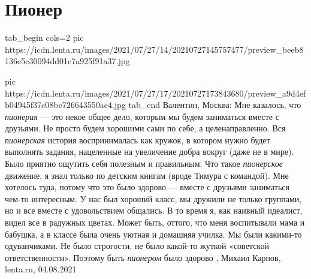  
 
 
 
 
\chapter{Пионер}

\ifcmt
tab_begin cols=2
  pic https://icdn.lenta.ru/images/2021/07/27/14/20210727145757477/preview_beeb8136c5c30094dd01c7a925f91a37.jpg

	pic https://icdn.lenta.ru/images/2021/07/27/17/20210727173843680/preview_a9d4efb04945f37c08bc726643550ae4.jpg
tab_end
\fi
Валентин, Москва: Мне казалось, что \emph{пионерия} — это некое общее дело, которым мы
будем заниматься вместе с друзьями. Не просто будем хорошими сами по себе, а
целенаправленно.  Вся \emph{пионерская} история воспринималась как кружок, в котором
нужно будет выполнять задания, нацеленные на увеличение добра вокруг (даже не в
мире). Было приятно ощутить себя полезным и правильным.  Что такое \emph{пионерское}
движение, я знал только по детским книгам (вроде Тимура с командой). Мне
хотелось туда, потому что это было здорово — вместе с друзьями заниматься
чем-то интересным. У нас был хороший класс, мы дружили не только группами, но и
все вместе с удовольствием общались.  В то время я, как наивный идеалист, видел
все в радужных цветах. Может быть, оттого, что меня воспитывали мама и бабушка,
а в классе была очень уютная и домашняя училка. Мы были какими-то одуванчиками.
Не было строгости, не было какой-то жуткой «советской ответственности». Поэтому
быть \emph{пионером} было здорово
, 
Михаил Карпов, lenta.ru, 04.08.2021
